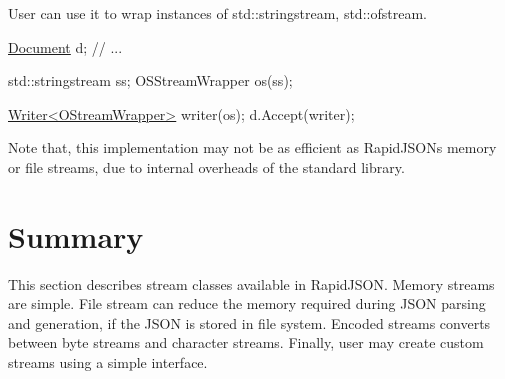 User can use it to wrap instances of {\ttfamily std\+::stringstream}, {\ttfamily std\+::ofstream}.


\begin{DoxyCode}
\hyperlink{class_generic_document}{Document} d;
\textcolor{comment}{// ...}

std::stringstream ss;
OSStreamWrapper os(ss);

\hyperlink{class_writer}{Writer<OStreamWrapper>} writer(os);
d.Accept(writer);
\end{DoxyCode}


Note that, this implementation may not be as efficient as Rapid\+J\+S\+ON\textquotesingle{}s memory or file streams, due to internal overheads of the standard library.\hypertarget{md_Commun_Externe_RapidJSON_doc_stream.zh-cn_Summary}{}\section{Summary}\label{md_Commun_Externe_RapidJSON_doc_stream.zh-cn_Summary}
This section describes stream classes available in Rapid\+J\+S\+ON. Memory streams are simple. File stream can reduce the memory required during J\+S\+ON parsing and generation, if the J\+S\+ON is stored in file system. Encoded streams converts between byte streams and character streams. Finally, user may create custom streams using a simple interface. 